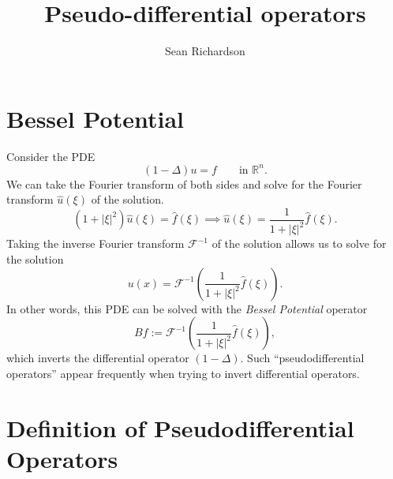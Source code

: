 \documentclass[
]{article}
\title{Pseudo-differential operators}
\author{Sean Richardson}
\date{}
\begin{document}
\maketitle

\hypertarget{bessel-potential}{%
\section{Bessel Potential}\label{bessel-potential}}

Consider the PDE \[
    (1-\Delta)u = f \quad\quad \text{in } \mathbb{R}^n.
\] We can take the Fourier transform of both sides and solve for the
Fourier transform \(\hat{u}(\xi)\) of the solution. \[
    (1+|\xi|^2)\hat{u}(\xi) = \hat{f}(\xi) \implies \hat{u}(\xi) = \frac{1}{1+|\xi|^2} \hat{f}(\xi).
\] Taking the inverse Fourier transform \(\mathcal{F}^{-1}\) of the
solution allows us to solve for the solution \[
    u(x) = \mathcal{F}^{-1}\left(\frac{1}{1+|\xi|^2}\hat{f}(\xi)\right).
\] In other words, this PDE can be solved with the \emph{Bessel
Potential} operator \[
    Bf := \mathcal{F}^{-1}\left(\frac{1}{1+|\xi|^2}\hat{f}(\xi)\right),
\] which inverts the differential operator \((1-\Delta)\). Such
``pseudodifferential operators'' appear frequently when trying to invert
differential operators.

\hypertarget{definition-of-pseudodifferential-operators}{%
\section{Definition of Pseudodifferential
Operators}\label{definition-of-pseudodifferential-operators}}
\end{document}
